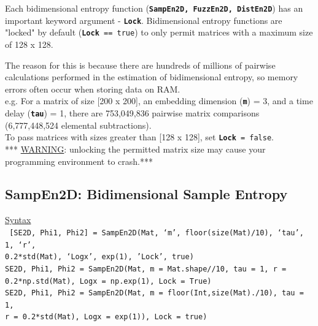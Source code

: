 \documentclass[12pt, a4paper, titlepage, openany]{book}
\begin{document}
\begin{tcolorbox}[sharp corners, colback=ehone!30, colframe=ehone, title=\hypertarget{bidinote}{\textbf{IMPORTANT NOTE}}, label={BiBox}]
Each bidimensional entropy function (\texttt{\textbf{SampEn2D, FuzzEn2D, DistEn2D}}) has an important keyword argument - \texttt{\textbf{Lock}}. Bidimensional entropy functions are "locked" by default (\texttt{\textbf{Lock} == true}) to only permit matrices with a maximum size of 128 x 128.\\ \newline

The reason for this is because there are hundreds of millions of pairwise calculations performed in the estimation of bidimensional entropy, so memory errors often occur when storing data on RAM.\\
e.g. For a matrix of size [200 x 200], an embedding dimension (\texttt{\textbf{m}}) = 3, and a time delay (\texttt{\textbf{tau}}) = 1, there are 753,049,836 pairwise matrix comparisons (6,777,448,524 elemental subtractions).\\ \newline
To pass matrices with sizes greater than [128 x 128], set \texttt{\textbf{Lock} = false}.\\ \newline
*** \ul{WARNING}: unlocking the permitted matrix size may cause your programming environment to crash.***\\
\end{tcolorbox}



\newpage
\subsection{\normalsize SampEn2D: \hspace{15mm} Bidimensional Sample Entropy}
\noindent\ul{Syntax} \vspace{6mm} \\ \noindent \texttt{\footnotesize
[SE2D, Phi1, Phi2] = SampEn2D(Mat, ‘m’, floor(size(Mat)/10), ‘tau’, 1, ‘r’, \\0.2*std(Mat), ‘Logx’, exp(1), 'Lock', true)\\
SE2D, Phi1, Phi2  = SampEn2D(Mat, m = Mat.shape//10, tau = 1, r = 0.2*np.std(Mat), Logx = np.exp(1), Lock = True)\\
SE2D, Phi1, Phi2 = SampEn2D(Mat, m = floor(Int,size(Mat)./10), tau = 1, \\ r = 0.2*std(Mat), Logx = exp(1)), Lock = true)}
\end{document}
